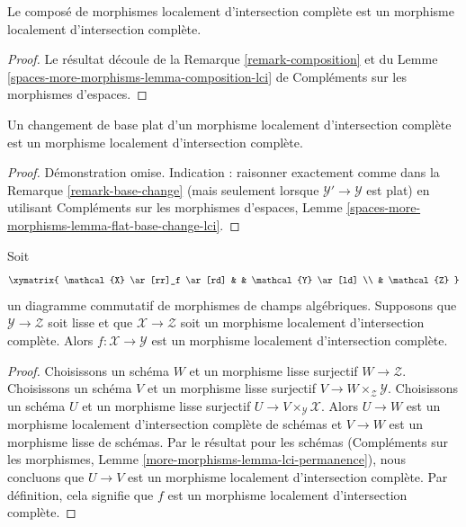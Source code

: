 \begin{lemma}
\label{lemma-composition-lci}
Le compos\'e de morphismes localement d'intersection compl\`ete est
un morphisme localement d'intersection compl\`ete.
\end{lemma}

\begin{proof}
Le résultat découle de
la Remarque \ref{remark-composition}
et du
Lemme \ref{spaces-more-morphisms-lemma-composition-lci}
de Compl\'ements sur les morphismes d'espaces.
\end{proof}

\begin{lemma}
\label{lemma-flat-base-change-lci}
Un changement de base plat d'un morphisme localement d'intersection compl\`ete est
un morphisme localement d'intersection compl\`ete.
\end{lemma}

\begin{proof}
D\'emonstration omise. Indication : raisonner exactement comme dans la Remarque \ref{remark-base-change}
(mais seulement lorsque $\mathcal{Y}' \to \mathcal{Y}$ est plat) en utilisant
Compl\'ements sur les morphismes d'espaces, Lemme
\ref{spaces-more-morphisms-lemma-flat-base-change-lci}.
\end{proof}

\begin{lemma}
\label{lemma-lci-permanence}
Soit
$$
\xymatrix{
\mathcal{X} \ar[rr]_f \ar[rd] & & \mathcal{Y} \ar[ld] \\
& \mathcal{Z}
}
$$
un diagramme commutatif de morphismes de champs alg\'ebriques.
Supposons que $\mathcal{Y} \to \mathcal{Z}$ soit lisse et que
$\mathcal{X} \to \mathcal{Z}$ soit un morphisme localement d'intersection compl\`ete.
Alors $f : \mathcal{X} \to \mathcal{Y}$ est un morphisme
localement d'intersection compl\`ete.
\end{lemma}

\begin{proof}
Choisissons un sch\'ema $W$ et un morphisme lisse surjectif $W \to \mathcal{Z}$.
Choisissons un sch\'ema $V$ et un morphisme lisse surjectif
$V \to W \times_\mathcal{Z} \mathcal{Y}$.
Choisissons un sch\'ema $U$ et un morphisme lisse surjectif
$U \to V \times_\mathcal{Y} \mathcal{X}$.
Alors $U \to W$ est un morphisme localement d'intersection compl\`ete de sch\'emas et
$V \to W$ est un morphisme lisse de sch\'emas. Par le r\'esultat pour les sch\'emas
(Compl\'ements sur les morphismes, Lemme \ref{more-morphisms-lemma-lci-permanence}),
nous concluons que $U \to V$ est un morphisme localement d'intersection compl\`ete.
Par d\'efinition, cela signifie que $f$ est un morphisme localement d'intersection compl\`ete.
\end{proof}





